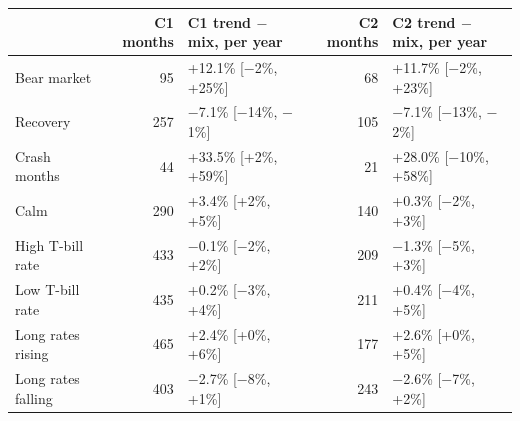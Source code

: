 \begin{tabular}{lrlrl}
\toprule
 & C1 months & C1 trend $-$ mix, per year & C2 months & C2 trend $-$ mix, per year \\
\midrule
Bear market & 95 & +12.1\% [$-$2\%, +25\%] & 68 & +11.7\% [$-$2\%, +23\%] \\
Recovery & 257 & $-$7.1\% [$-$14\%, $-$1\%] & 105 & $-$7.1\% [$-$13\%, $-$2\%] \\
Crash months & 44 & +33.5\% [+2\%, +59\%] & 21 & +28.0\% [$-$10\%, +58\%] \\
Calm & 290 & +3.4\% [+2\%, +5\%] & 140 & +0.3\% [$-$2\%, +3\%] \\
High T-bill rate & 433 & $-$0.1\% [$-$2\%, +2\%] & 209 & $-$1.3\% [$-$5\%, +3\%] \\
Low T-bill rate & 435 & +0.2\% [$-$3\%, +4\%] & 211 & +0.4\% [$-$4\%, +5\%] \\
Long rates rising & 465 & +2.4\% [+0\%, +6\%] & 177 & +2.6\% [+0\%, +5\%] \\
Long rates falling & 403 & $-$2.7\% [$-$8\%, +1\%] & 243 & $-$2.6\% [$-$7\%, +2\%] \\
\bottomrule
\end{tabular}
